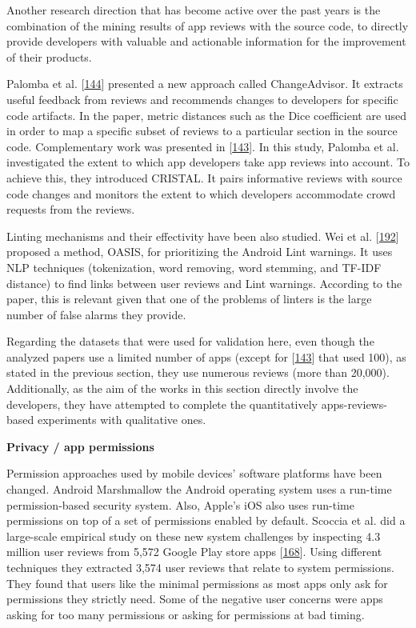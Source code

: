 \documentclass[]{book}
\begin{document}
Another research direction that has become active over the past years is
the combination of the mining results of app reviews with the source
code, to directly provide developers with valuable and actionable
information for the improvement of their products.

Palomba et al.
{[}\protect\hyperlink{ref-palomba2017recommending}{144}{]} presented a
new approach called ChangeAdvisor. It extracts useful feedback from
reviews and recommends changes to developers for specific code
artifacts. In the paper, metric distances such as the Dice coefficient
are used in order to map a specific subset of reviews to a particular
section in the source code. Complementary work was presented in
{[}\protect\hyperlink{ref-palomba2018crowdsourcing}{143}{]}. In this
study, Palomba et al. investigated the extent to which app developers
take app reviews into account. To achieve this, they introduced CRISTAL.
It pairs informative reviews with source code changes and monitors the
extent to which developers accommodate crowd requests from the reviews.

Linting mechanisms and their effectivity have been also studied. Wei et
al. {[}\protect\hyperlink{ref-wei2017oasis}{192}{]} proposed a method,
OASIS, for prioritizing the Android Lint warnings. It uses NLP
techniques (tokenization, word removing, word stemming, and TF-IDF
distance) to find links between user reviews and Lint warnings.
According to the paper, this is relevant given that one of the problems
of linters is the large number of false alarms they provide.

Regarding the datasets that were used for validation here, even though
the analyzed papers use a limited number of apps (except for
{[}\protect\hyperlink{ref-palomba2018crowdsourcing}{143}{]} that used
100), as stated in the previous section, they use numerous reviews (more
than 20,000). Additionally, as the aim of the works in this section
directly involve the developers, they have attempted to complete the
quantitatively apps-reviews-based experiments with qualitative ones.

\textbf{Privacy / app permissions}

Permission approaches used by mobile devices' software platforms have
been changed. Android Marshmallow the Android operating system uses a
run-time permission-based security system. Also, Apple's iOS also uses
run-time permissions on top of a set of permissions enabled by default.
Scoccia et al. did a large-scale empirical study on these new system
challenges by inspecting 4.3 million user reviews from 5,572 Google Play
store apps {[}\protect\hyperlink{ref-scoccia2018investigation}{168}{]}.
Using different techniques they extracted 3,574 user reviews that relate
to system permissions. They found that users like the minimal
permissions as most apps only ask for permissions they strictly need.
Some of the negative user concerns were apps asking for too many
permissions or asking for permissions at bad timing.
\end{document}
